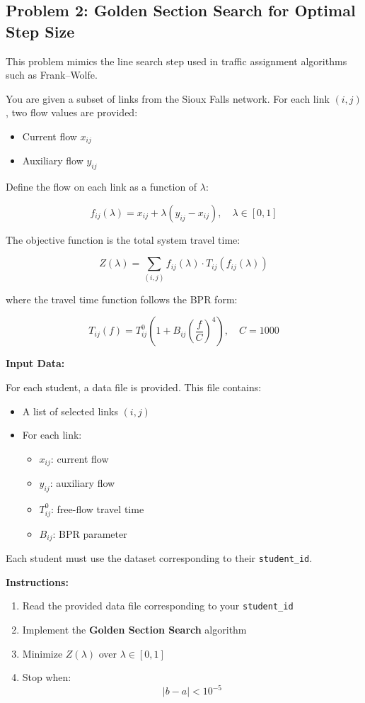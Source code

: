 \documentclass{rapportCS} %
\begin{document}
\subsection*{Problem 2: Golden Section Search for Optimal Step Size}

This problem mimics the line search step used in traffic assignment algorithms such as Frank–Wolfe.

You are given a subset of links from the Sioux Falls network. For each link \( (i,j) \), two flow values are provided:
\begin{itemize}
    \item Current flow \( x_{ij} \)
    \item Auxiliary flow \( y_{ij} \)
\end{itemize}

Define the flow on each link as a function of \( \lambda \):

$$ f_{ij}(\lambda) = x_{ij} + \lambda (y_{ij} - x_{ij}), \quad \lambda \in [0,1] $$

The objective function is the total system travel time:

$$ Z(\lambda) = \sum_{(i,j)} f_{ij}(\lambda) \cdot T_{ij}(f_{ij}(\lambda)) $$

where the travel time function follows the BPR form:

$$ T_{ij}(f) = T_{ij}^0 \left( 1 + B_{ij} \left( \frac{f}{C} \right)^4 \right), \quad C = 1000 $$

\textbf{Input Data:}

For each student, a data file is provided. This file contains:
\begin{itemize}
    \item A list of selected links \( (i,j) \)
    \item For each link:
    \begin{itemize}
        \item \( x_{ij} \): current flow
        \item \( y_{ij} \): auxiliary flow
        \item \( T_{ij}^0 \): free-flow travel time
        \item \( B_{ij} \): BPR parameter
    \end{itemize}
\end{itemize}

Each student must use the dataset corresponding to their \texttt{student\_id}.

\textbf{Instructions:}
\begin{enumerate}
    \item Read the provided data file corresponding to your \texttt{student\_id}
    \item Implement the \textbf{Golden Section Search} algorithm
    \item Minimize \( Z(\lambda) \) over \( \lambda \in [0,1] \)
    \item Stop when:
    $$ |b - a| < 10^{-5} $$
\end{enumerate}
\end{document}
